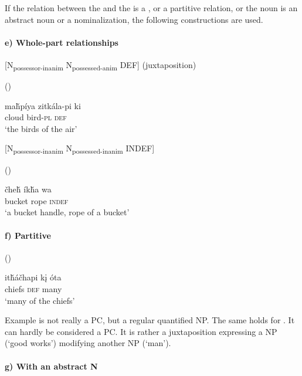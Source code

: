 \documentclass[output=paper]{LSP/langsci}
\begin{document}
If the relation between the  and the  is a , or a partitive relation, or the  noun is an abstract noun or a nominalization, the following constructions are used. 

\paragraph*{e)	Whole-part relationships}

[N\textsubscript{possessor-inanim} N\textsubscript{possessed-anim} DEF] (juxtaposition)

\ea {} (\citealt[92]{Buechel1939})

\gll ma\v{h}píya zitkála-pi  ki  \\
cloud      bird-\textsc{pl} \textsc{def} \\
\glt `the birds of the air'
\z

[N\textsubscript{possessor-inanim} N\textsubscript{possessed-inanim} INDEF] 

\ea {} (\citealt[92]{Buechel1939})

\gll  \v{c}he\v{h} \'ik\v{h}a wa \\  
bucket rope \textsc{indef} \\
\glt `a bucket handle, rope of a bucket' 
\z 

\newpage
\paragraph*{f)	Partitive}

\ea {} (\citealt[93]{Buechel1939}) \label{lakotamanychiefs}

\gll it\v{h}\'a\v{c}hapi k\k{i} \'ota \\
chiefs \textsc{def} many \\
\glt `many of the chiefs'
\z

Example  is not really a PC, but a regular quantified NP. The same holds for . It can hardly be considered a PC. It is rather a juxtaposition expressing a NP (`good works') modifying another NP (`man').

 

\paragraph*{g)	With an abstract  N}
\end{document}
